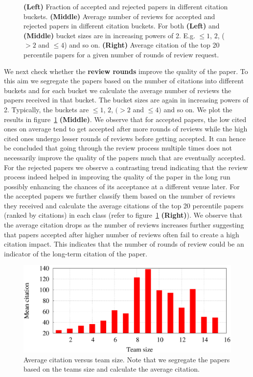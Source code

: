 \begin{figure}[htpb]
\begin{tabular}{ccc}
 \end{tabular}
  \caption{{\bf (Left)} Fraction of accepted and rejected papers in different citation buckets. {\bf (Middle)} Average number of reviews for accepted and rejected papers in different citation buckets. For both {\bf (Left)} and {\bf(Middle) } bucket sizes are in increasing powers of 2. E.g. $\leq 1$, $2$, ($>2$ and $\leq 4$) and so on. {\bf (Right)} Average citation of the top 20 percentile  papers for a given number of rounds of review request.}
   \label{fig4}
   \vspace{4mm}
 \end{figure}


We next check whether the {\bf review rounds} improve the quality of the paper. To this aim we segregate the papers based on the number of citations into different buckets and for each bucket we calculate the average number of reviews the papers received in that bucket. The bucket sizes are again in increasing powers of 2. Typically, the buckets are $\leq 1$, $2$, $(>2$ and $\leq 4)$ and so on. We plot the results in figure~\ref{fig4} {\bf (Middle)}. We observe that for accepted papers, the low cited ones on average tend to get accepted after more rounds of reviews while the high cited ones undergo lesser rounds of reviews before getting accepted. It can hence be concluded that going through the review process multiple times does not necessarily improve the quality of the papers much that are eventually accepted. For the rejected papers we observe a contrasting trend indicating that the review process indeed helped in improving the quality of the paper in the long run possibly enhancing the chances of its acceptance at a different venue later. For the accepted papers we further classify them based on the number of reviews they received and calculate the average citations of the top 20 percentile papers (ranked by citations) in each class (refer to figure~\ref{fig4} {\bf (Right)}). We observe that the average citation drops as the number of reviews increases further suggesting that papers accepted after higher number of reviews often fail to create a high citation impact. This indicates that the number of rounds of review could be an indicator of the long-term citation of the paper. 

\begin{figure}
\centering
\includegraphics[scale  = 0.25]{./texfiles/Chapter_4/jcdl/figures/team_citation}
\caption{\label{team:citation} Average citation versus team size. Note that we segregate the papers based on the teams size and calculate the average citation.}
\vspace{4mm}
\end{figure}


